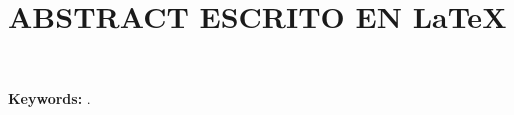 \pagestyle{fancy}
\section{ABSTRACT ESCRITO EN \LaTeX}

    \begin{justify}
        \lipsum[1-2][1-20]\\
    \end{justify}
    
    \begin{justify}
        \textbf{Keywords:} \lipsum[1][1].
    \end{justify}